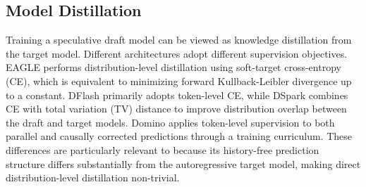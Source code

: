 \subsection{Model Distillation}

Training a speculative draft model can be viewed as knowledge distillation from the target model. Different architectures adopt different supervision objectives. EAGLE performs distribution-level distillation using soft-target cross-entropy (CE), which is equivalent to minimizing forward Kullback-Leibler divergence up to a constant. DFlash primarily adopts token-level CE, while DSpark combines CE with total variation (TV) distance to improve distribution overlap between the draft and target models. Domino applies token-level supervision to both parallel and causally corrected predictions through a training curriculum. These differences are particularly relevant to \we because its history-free prediction structure differs substantially from the autoregressive target model, making direct distribution-level distillation non-trivial.








